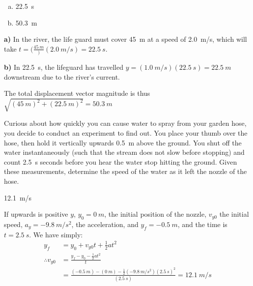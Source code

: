 \begin{finalanswer}
\begin{enumerate}[(a)]
\item \SI{22.5}{s}
\item \SI{50.3}{m}
\end{enumerate}
\end{finalanswer}
\begin{solution}
\textbf{a)}
In the river, the life guard must cover \SI{45}{m} at a speed of \SI{2.0}{m/s}, which will take $t=(\frac{\SI{45}{m}})({\SI{2.0}{m/s}})=\SI{22.5}{s}$.

\textbf{b)} In \SI{22.5}{s}, the lifeguard has travelled $y=(\SI{1.0}{m/s})(\SI{22.5}{s})=\SI{22.5}{m}$ downstream due to the river's current.

The total displacement vector magnitude is thus $\sqrt{(\SI{45}{m})^2+(\SI{22.5}{m})^2}=\SI{50.3}{m}$
\end{solution}

\question Curious about how quickly you can cause water to spray from your garden hose, you decide to conduct an experiment to find out. You place your thumb over the hose, then hold it vertically upwards \SI{0.5}{m} above the ground. You shut off the water instantaneously (such that the stream does not slow before stopping) and count \SI{2.5}{s} seconds before you hear the water stop hitting the ground. Given these measurements, determine the speed of the water as it left the nozzle of the hose.

\begin{finalanswer}
\SI{12.1}{m/s}
\end{finalanswer}
\begin{solution}
If upwards is positive $y$, $y_0=\SI{0}{m}$, the initial position of the nozzle, $v_{y0}$ the initial speed, $a_y=\SI{-9.8}{m/s^2}$, the acceleration, and $y_f=\SI{-0.5}{m}$, and the time is $t=\SI{2.5}{s}$. We have simply:
\begin{align*}
y_f &= y_0 + v_{y0}t+\frac{1}{2}at^2\\
\therefore v_{y0} &= \frac{y_f-y_0-\frac{1}{2}at^2}{t}\\
&=\frac{(\SI{-0.5}{m})-(\SI{0}{m})-\frac{1}{2}(\SI{-9.8}{m/s^2})(\SI{2.5}{s})^2}{(\SI{2.5}{s})}=\SI{12.1}{m/s}
\end{align*}
\end{solution}

